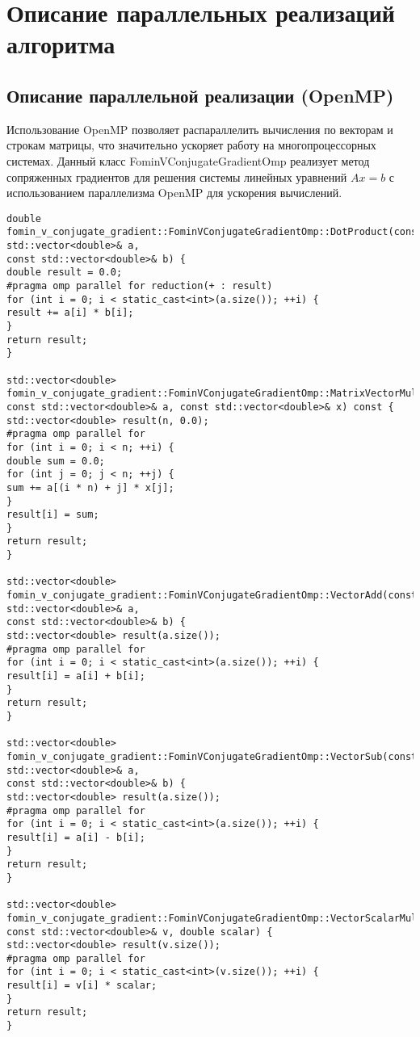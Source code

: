 \documentclass[12pt]{article}
\begin{document}
\section{Описание параллельных реализаций алгоритма}

\subsection{Описание параллельной реализации (OpenMP)}

\hspace*{1.35em}Использование OpenMP позволяет распараллелить вычисления по векторам и строкам матрицы, что значительно ускоряет работу на многопроцессорных системах.
Данный класс FominVConjugateGradientOmp реализует метод сопряженных градиентов для решения системы линейных уравнений \( Ax = b \) с использованием параллелизма OpenMP для ускорения вычислений.

\begin{verbatim}
double fomin_v_conjugate_gradient::FominVConjugateGradientOmp::DotProduct(const std::vector<double>& a,
const std::vector<double>& b) {
double result = 0.0;
#pragma omp parallel for reduction(+ : result)
for (int i = 0; i < static_cast<int>(a.size()); ++i) {
result += a[i] * b[i];
}
return result;
}

std::vector<double> fomin_v_conjugate_gradient::FominVConjugateGradientOmp::MatrixVectorMultiply(
const std::vector<double>& a, const std::vector<double>& x) const {
std::vector<double> result(n, 0.0);
#pragma omp parallel for
for (int i = 0; i < n; ++i) {
double sum = 0.0;
for (int j = 0; j < n; ++j) {
sum += a[(i * n) + j] * x[j];
}
result[i] = sum;
}
return result;
}

std::vector<double> fomin_v_conjugate_gradient::FominVConjugateGradientOmp::VectorAdd(const std::vector<double>& a,
const std::vector<double>& b) {
std::vector<double> result(a.size());
#pragma omp parallel for 
for (int i = 0; i < static_cast<int>(a.size()); ++i) {
result[i] = a[i] + b[i];
}
return result;
}

std::vector<double> fomin_v_conjugate_gradient::FominVConjugateGradientOmp::VectorSub(const std::vector<double>& a,
const std::vector<double>& b) {
std::vector<double> result(a.size());
#pragma omp parallel for
for (int i = 0; i < static_cast<int>(a.size()); ++i) {
result[i] = a[i] - b[i];
}
return result;
}

std::vector<double> fomin_v_conjugate_gradient::FominVConjugateGradientOmp::VectorScalarMultiply(
const std::vector<double>& v, double scalar) {
std::vector<double> result(v.size());
#pragma omp parallel for 
for (int i = 0; i < static_cast<int>(v.size()); ++i) {
result[i] = v[i] * scalar;
}
return result;
}
\end{verbatim}
\end{document}
